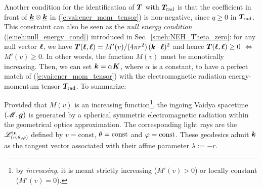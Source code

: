 Another condition for the identification of $\bm{T}$ with $\bm{T}_{\rm rad}$ is that the coefficient
in front of $\underline{\bm{k}} \otimes \underline{\bm{k}}$ in (\ref{e:vai:ener_mom_tensor})
is non-negative, since $q\geq 0$ in $\bm{T}_{\rm rad}$. This constraint can also be seen as the \emph{null energy condition} (\ref{e:neh:null_energy_cond}) introduced in
Sec.~\ref{s:neh:NEH_Theta_zero}: for any null vector $\bm{\ell}$, we have
$\bm{T}(\bm{\ell},\bm{\ell}) = M'(v)/(4\pi r^2)\, (\bm{k}\cdot\bm{\ell})^2$ and hence $\bm{T}(\bm{\ell},\bm{\ell}) \geq 0$ $\iff$
$M'(v) \geq 0$. In other words, the function $M(v)$ must be monotically increasing. Then, we can set
$\bm{k} = \alpha \bm{K}$, where $\alpha$ is a constant, to have a perfect match of (\ref{e:vai:ener_mom_tensor}) with the electromagnetic radiation energy-momentum
tensor $\bm{T}_{\rm rad}$.
To summarize:
\begin{greybox}
Provided that $M(v)$ is an increasing function\footnote{by \emph{increasing}, it is meant
strictly increasing ($M'(v)>0$) or locally constant ($M'(v) = 0$).},
the ingoing Vaidya spacetime $(\mathscr{M},\bm{g})$ is generated by a spherical symmetric electromagnetic radiation
within the geometrical optics approximation. The corresponding light rays are the
$\mathscr{L}^{\rm in}_{(v,\theta,\varphi)}$
defined by $v=\mathrm{const}$, $\theta=\mathrm{const}$ and $\varphi=\mathrm{const}$.
These geodesics admit $\bm{k}$ as the tangent vector associated with their affine parameter
$\lambda := -r$.
\end{greybox}

